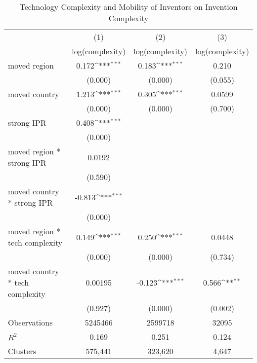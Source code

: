 {
\def\sym#1{\ifmmode^{#1}\else\(^{#1}\)\fi}
\begin{longtable}{l*{3}{c}}
\caption{Technology Complexity and Mobility of Inventors on Invention Complexity \label{model4a4b4c}}\\
\hline\hline\endfirsthead\hline\endhead\hline\endfoot\endlastfoot
                &\multicolumn{1}{c}{(1)}&\multicolumn{1}{c}{(2)}&\multicolumn{1}{c}{(3)}\\
                &\multicolumn{1}{c}{log(complexity)}&\multicolumn{1}{c}{log(complexity)}&\multicolumn{1}{c}{log(complexity)}\\
\hline
moved region    &    0.172\sym{***}&    0.183\sym{***}&    0.210         \\
                &  (0.000)         &  (0.000)         &  (0.055)         \\
moved country   &    1.213\sym{***}&    0.305\sym{***}&   0.0599         \\
                &  (0.000)         &  (0.000)         &  (0.700)         \\
strong IPR      &    0.408\sym{***}&                  &                  \\
                &  (0.000)         &                  &                  \\
moved region * strong IPR&   0.0192         &                  &                  \\
                &  (0.590)         &                  &                  \\
moved country * strong IPR&   -0.813\sym{***}&                  &                  \\
                &  (0.000)         &                  &                  \\
moved region * tech complexity&    0.149\sym{***}&    0.250\sym{***}&   0.0448         \\
                &  (0.000)         &  (0.000)         &  (0.734)         \\
moved country * tech complexity&  0.00195         &   -0.123\sym{***}&    0.566\sym{**} \\
                &  (0.927)         &  (0.000)         &  (0.002)         \\
\hline
Observations    &  5245466         &  2599718         &    32095         \\
$R^2$              &    0.169         &    0.251         &    0.124         \\
Clusters         &  575,441         &  323,620         &    4,647         \\

\end{longtable}}
